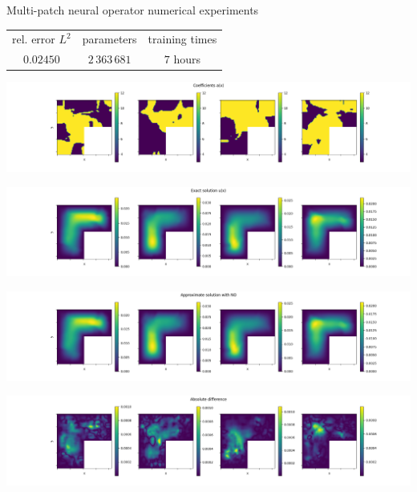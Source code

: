\documentclass{beamer}
\begin{document}

\begin{frame}{Multi-patch neural operator numerical experiments}
	\begin{table}[h!] %
		\centering
		\begin{tabular}{ccc}\toprule
		rel. error $ L^2 $ & parameters & training times\\
			\cmidrule{1-3}
			$ 0.02450 $ & $ 2\, 363\, 681 $ & $ 7 $ hours\\
			\bottomrule
		\end{tabular}
	\end{table}
	\begin{center}
        \begin{minipage}{0.24\textwidth}
            \includegraphics[width=\textwidth]{MPNO_input.png}
        \end{minipage}
        \hfill
        \begin{minipage}{0.24\textwidth}
            \includegraphics[width=\textwidth]{MPNO_output.png}
        \end{minipage}
        \hfill
        \begin{minipage}{0.24\textwidth}
            \includegraphics[width=\textwidth]{MPNO_appro.png}
        \end{minipage}
        \hfill
        \begin{minipage}{0.24\textwidth}
            \includegraphics[width=\textwidth]{MPNO_error.png}
        \end{minipage}
    \end{center}
\end{frame}
\end{document}
